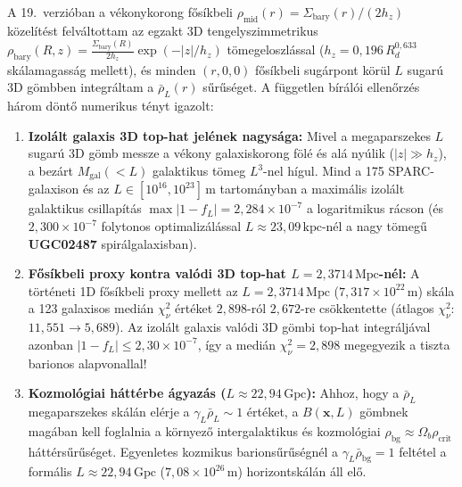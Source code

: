 \par
A 19.\ verzi\'oban a v\'ekonykorong f\H{o}s\'ikbeli $\rho_{\text{mid}}(r) = \Sigma_{\text{bary}}(r)/(2h_z)$ k\"ozel\'it\'est felv\'altottam az egzakt 3D tengelyszimmetrikus $\rho_{\text{bary}}(R,z) = \frac{\Sigma_{\text{bary}}(R)}{2h_z}\exp(-|z|/h_z)$ t\"omegeloszl\'assal ($h_z = 0{,}196\,R_d^{0{,}633}$ sk\'alamagass\'ag mellett), \'es minden $(r,0,0)$ f\H{o}s\'ikbeli sug\'arpont k\"or\"ul $L$ sugar\'u 3D g\"ombben integr\'altam a $\bar{\rho}_L(r)$ s\H{u}r\H{u}s\'eget. A f\"uggetlen b\'ir\'al\'oi ellen\H{o}rz\'es h\'arom d\"ont\H{o} numerikus t\'enyt igazolt:
\begin{enumerate}\setlength{\itemsep}{1pt}\setlength{\parskip}{0pt}\setlength{\topsep}{1pt}
  \item \textbf{Izol\'alt galaxis 3D top-hat jel\'enek nagys\'aga:} Mivel a megaparszekes $L$ sugar\'u 3D g\"omb messze a v\'ekony galaxiskorong f\"ol\'e \'es al\'a ny\'ulik ($|z| \gg h_z$), a bez\'art $M_{\text{gal}}(<\!L)$ galaktikus t\"omeg $L^3$-nel h\'igul. Mind a 175 SPARC-galaxison \'es az $L \in [10^{16}, 10^{23}]\,\text{m}$ tartom\'anyban a maxim\'alis izol\'alt galaktikus csillap\'it\'as $\max |1 - f_L| = 2{,}284\times 10^{-7}$ a logaritmikus r\'acson (\'es \textbf{$2{,}300\times 10^{-7}$} folytonos optimaliz\'al\'assal $L \approx 23{,}09\,\text{kpc}$-n\'el a nagy t\"omeg\H{u} \textbf{UGC02487} spir\'algalaxisban).
  \item \textbf{F\H{o}s\'ikbeli proxy kontra val\'odi 3D top-hat $L = 2{,}3714\,\text{Mpc}$-n\'el:} A t\"ort\'eneti 1D f\H{o}s\'ikbeli proxy mellett az $L = 2{,}3714\,\text{Mpc}$ ($7{,}317\times 10^{22}\,\text{m}$) sk\'ala a 123 galaxisos medi\'an $\chi^2_\nu$ \'ert\'eket $2{,}898$-r\'ol $2{,}672$-re cs\"okkentette (\'atlagos $\chi^2_\nu$: $11{,}551 \to 5{,}689$). Az izol\'alt galaxis val\'odi 3D g\"ombi top-hat integr\'alj\'aval azonban $|1-f_L| \le 2{,}30\times 10^{-7}$, \'igy a medi\'an $\chi^2_\nu = 2{,}898$ megegyezik a tiszta barionos alapvonallal!
  \item \textbf{Kozmol\'ogiai h\'att\'erbe \'agyaz\'as ($L \approx 22{,}94\,\text{Gpc}$):} Ahhoz, hogy a $\bar{\rho}_L$ megaparszekes sk\'al\'an el\'erje a $\gamma_L\bar{\rho}_L \sim 1$ \'ert\'eket, a $B(\mathbf{x},L)$ g\"ombnek mag\'aban kell foglalnia a k\"ornyez\H{o} intergalaktikus \'es kozmol\'ogiai $\rho_{\text{bg}} \approx \Omega_b\rho_{\text{crit}}$ h\'att\'ers\H{u}r\H{u}s\'eget. Egyenletes kozmikus barions\H{u}r\H{u}s\'egn\'el a $\gamma_L\bar{\rho}_{\text{bg}} = 1$ felt\'etel a form\'alis $L \approx 22{,}94\,\text{Gpc}$ ($7{,}08\times 10^{26}\,\text{m}$) horizontsk\'al\'an \'all el\H{o}.
\end{enumerate}

